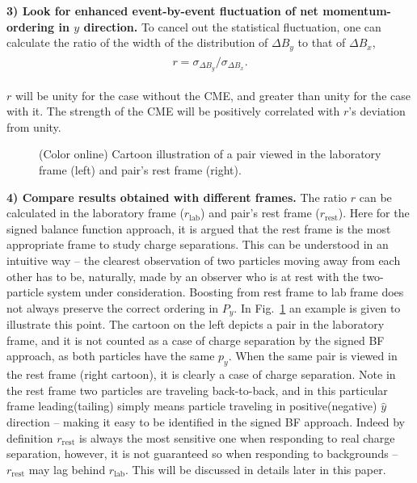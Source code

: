 \textbf{3) Look for enhanced event-by-event fluctuation of net momentum-ordering in $y$ direction. } To cancel out the statistical fluctuation, one can calculate the ratio of the width of the distribution of $\Delta B_{y}$ to that of $\Delta B_{x}$,
\begin{eqnarray}
\begin{aligned}
r= \sigma_{\Delta B_y} / \sigma_{\Delta B_{x}}.
\end{aligned}
\label{eq:r}
\end{eqnarray}


 $r$ will be unity for the case without the CME, and greater than unity for the case with it. The strength of the CME will be positively correlated with $r$'s deviation from unity.
\begin{figure}[htbp]
\centering
{}
\caption{(Color online) Cartoon illustration of a pair viewed in the laboratory frame (left) and pair's rest frame (right). }
\label{fig:boost_cartoon}
\end{figure}

\textbf{4) Compare results obtained with different frames. } The ratio $r$ can be calculated in the laboratory frame ($r_{\mathrm{lab}}$) and pair's rest frame ($r_{\mathrm{rest}}$). Here for the signed balance function approach, it is argued that the rest frame is the most appropriate frame to study charge separations. This can be understood in an intuitive way -- the clearest observation of two particles moving away from each other has to be, naturally, made by an observer who is at rest with the two-particle system under consideration. Boosting from rest frame to lab frame does not always preserve the correct ordering in $P_y$. In Fig.~\ref{fig:boost_cartoon} an example is given to illustrate this point. The cartoon on the left depicts a pair in the laboratory frame, and it is not counted as a case of charge separation by the signed BF approach, as both particles have the same $p_y$. When the same pair is viewed in the rest frame (right cartoon), it is clearly a case of charge separation. Note in the rest frame two particles are traveling back-to-back, and in this particular frame leading(tailing) simply means particle traveling in positive(negative) $\hat{y}$ direction -- making it easy to be identified in the signed BF approach. Indeed by definition $r_{\mathrm{rest}}$ is always the most sensitive one when responding to real charge separation, however, it is not guaranteed so when responding to backgrounds --  $r_{\mathrm{rest}}$ may lag behind $r_{\mathrm{lab}}$. This will be discussed in details later in this paper. 

